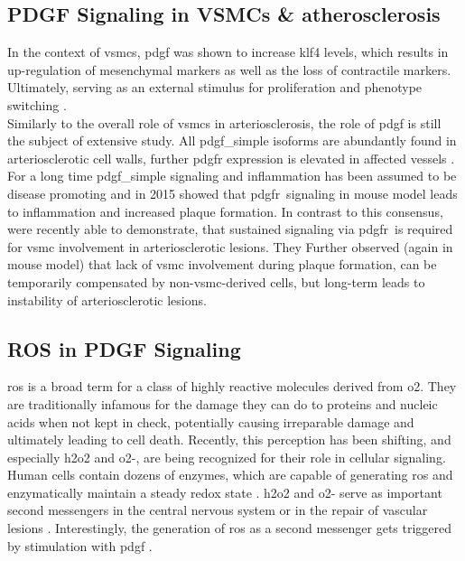     \subsection{PDGF Signaling in VSMCs \& atherosclerosis}
    \label{subsec:pdgf_in_disease}
    In the context of \acp{vsmc}, \ac{pdgf} was shown to increase \ac{klf4} levels, which results in up-regulation of mesenchymal markers as well as the loss of contractile markers. Ultimately, serving as an external stimulus for proliferation and phenotype switching \cite{yapSixShadesVascular2021}.\\
    Similarly to the overall role of \acp{vsmc} in arteriosclerosis, the role of \ac{pdgf} is still the subject of extensive study. All \ac{pdgf_simple} isoforms are abundantly found in arteriosclerotic cell walls, further \ac{pdgfr} expression is elevated in affected vessels \cite{huTargetingPlateletderivedGrowth2015}. For a long time \ac{pdgf_simple} signaling and inflammation has been assumed to be disease promoting \cite{andraeRolePlateletderivedGrowth2008, chenPlateletderivedGrowthFactors2013, huTargetingPlateletderivedGrowth2015} and in 2015 \textcite{hePDGFRvSignallingRegulates2015} showed that \ac{pdgfr}\beta~signaling in mouse model leads to inflammation and increased plaque formation. In contrast to this consensus, \textcite{newmanMultipleCellTypes2021} were recently able to demonstrate, that sustained signaling via \ac{pdgfr}\beta~is required for \ac{vsmc} involvement in arteriosclerotic lesions. They Further observed (again in mouse model) that lack of \ac{vsmc} involvement during plaque formation, can be temporarily compensated by non-\ac{vsmc}-derived cells, but long-term leads to instability of arteriosclerotic lesions.

    \subsection{ROS in PDGF Signaling}
    \label{subsec:ROS_signaling}
    \Ac{ros} is a broad term for a class of highly reactive molecules derived from \ac{o2}. They are traditionally infamous for the damage they can do to proteins and nucleic acids when not kept in check, potentially causing irreparable damage and ultimately leading to cell death. Recently, this perception has been shifting, and especially \ac{h2o2} and \ac{o2-}, are being recognized for their role in cellular signaling. \cite{siesReactiveOxygenSpecies2020}\\
    Human cells contain dozens of enzymes, which are capable of generating \ac{ros} and enzymatically maintain a steady redox state \cite{siesReactiveOxygenSpecies2020}. \ac{h2o2} and \ac{o2-} serve as important second messengers in the central nervous system \cite{nayerniaNewInsightsNOX2014} or in the repair of vascular lesions \cite{andraeRolePlateletderivedGrowth2008}. Interestingly, the generation of \ac{ros} as a second messenger gets triggered by stimulation with \ac{pdgf} \cite{sundaresanRequirementGenerationH2O21995, bouziguesRegulationROSResponse2014a}.


